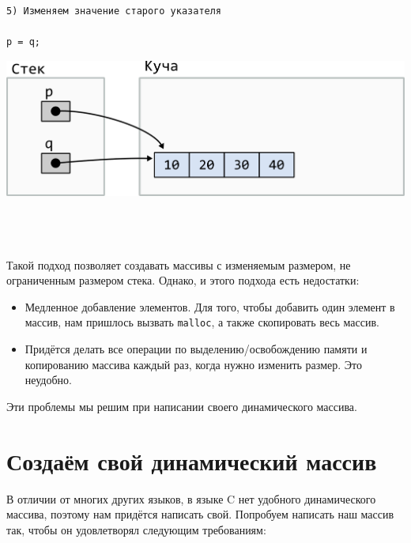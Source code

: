 \documentclass[10pt]{article}
\begin{document}
\noindent\begin{minipage}{.45\textwidth}
\begin{lstlisting}
5) Изменяем значение старого указателя

p = q;
\end{lstlisting}
\end{minipage}
\begin{minipage}{.45\textwidth}
\includegraphics[scale=0.75]{../images/malloc_realocation5.png}
\end{minipage}
\quad\\
\quad\\
\quad\\

\noindent Такой подход позволяет создавать массивы с изменяемым размером, не ограниченным размером стека.
Однако, и этого подхода есть недостатки:
\begin{itemize}
\item Медленное добавление элементов. Для того, чтобы добавить один элемент в массив, нам пришлось вызвать \texttt{malloc}, а также скопировать весь массив.
\item Придётся делать все операции по выделению/освобождению памяти и копированию массива каждый раз, когда нужно изменить размер. Это неудобно.
\end{itemize}
Эти проблемы мы решим при написании своего динамического массива.

\newpage
\section*{Создаём свой динамический массив}

В отличии от многих других языков, в языке C нет удобного динамического массива, поэтому нам придётся написать свой. Попробуем написать наш массив так, чтобы он удовлетворял следующим требованиям:
\end{document}
